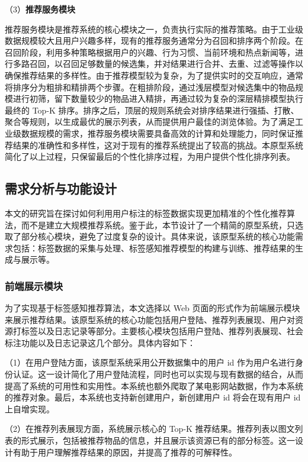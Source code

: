（3）\textbf{推荐服务模块}

推荐服务模块是推荐系统的核心模块之一，负责执行实际的推荐策略。由于工业级数据规模较大且用户兴趣多样，现有的推荐服务通常分为召回和排序两个阶段。在召回阶段，利用多种策略根据用户的兴趣、行为习惯、当前环境和热点新闻等，进行多路召回，以召回足够数量的候选集，并对结果进行合并、去重、过滤等操作以确保推荐结果的多样性。由于推荐模型较为复杂，为了提供实时的交互响应，通常将排序分为粗排和精排两个步骤。在粗排阶段，通过浅层模型对候选集中的物品规模进行初筛，留下数量较少的物品进入精排，再通过较为复杂的深层精排模型执行最终的 Top-K 排序。排序之后，顶层的规则系统会对排序结果进行强插、打散、聚合等规则，以生成最优的展示列表，从而提供用户最佳的浏览体验。为了满足工业级数据规模的需求，推荐服务模块需要具备高效的计算和处理能力，同时保证推荐结果的准确性和多样性，这对于现有的推荐系统提出了较高的挑战。本原型系统简化了以上过程，只保留最后的个性化排序过程，为用户提供个性化排序列表。

\subsection{需求分析与功能设计}

本文的研究旨在探讨如何利用用户标注的标签数据实现更加精准的个性化推荐算法，而不是建立大规模推荐系统。鉴于此，本节设计了一个精简的原型系统，只选取了部分核心模块，避免了过度复杂的设计。具体来说，该原型系统的核心功能需求包括：标签数据的采集与处理、标签感知推荐模型的构建与训练、推荐结果的生成与展示等。

\subsubsection{前端展示模块}
为了实现基于标签感知推荐算法，本文选择以 Web 页面的形式作为前端展示模块来展示推荐结果。该原型系统的核心功能包括用户登陆、推荐列表展现、用户对资源打标签以及日志记录等部分。主要核心模块包括用户登陆、推荐列表展现、社会标注功能以及日志记录这几个部分。具体内容如下：

（1）在用户登陆方面，该原型系统采用公开数据集中的用户 id 作为用户名进行身份认证。这一设计简化了用户登陆流程，同时也可以实现与现有数据的结合，从而提高了系统的可用性和实用性。本系统也额外爬取了某电影网站数据，作为本系统的推荐对象。最后，本系统也支持新创建用户，新创建用户 id 将会在现有用户 id 上自增实现。

（2）在推荐列表展现方面，系统展示核心的 Top-K 推荐结果。推荐列表以图文列表的形式展示，包括被推荐物品的信息，并且展示该资源已有的部分标签。这一设计有助于用户理解推荐结果的原因，并提高了推荐的可解释性。

